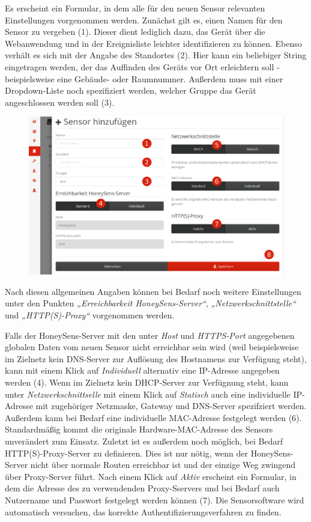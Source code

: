 \documentclass[12pt]{article}
\begin{document}
Es erscheint ein Formular, in dem alle für den neuen Sensor relevanten Einstellungen vorgenommen werden. Zunächst gilt es, einen Namen für den Sensor zu vergeben (1). Dieser dient lediglich dazu, das Gerät über die Webanwendung und in der Ereignisliste leichter identifizieren zu können. Ebenso verhält es sich mit der Angabe des Standortes (2). Hier kann ein beliebiger String eingetragen werden, der das Auffinden des Geräts vor Ort erleichtern soll - beispielsweise eine Gebäude- oder Raumnummer. Außerdem muss mit einer Dropdown-Liste noch spezifiziert werden, welcher Gruppe das Gerät angeschlossen werden soll (3).

\begin{figure}[h]
				\centering
				\includegraphics[width=\textwidth]{./graphics/howto-sensor-add-2.png}
				\label{fig:howto-sensor-add-2}
\end{figure}

Nach diesen allgemeinen Angaben können bei Bedarf noch weitere Einstellungen unter den Punkten \textit{„Erreichbarkeit HoneySens-Server“}, \textit{„Netzwerkschnittstelle“} und \textit{„HTTP(S)-Proxy“} vorgenommen werden. 

Falls der HoneySens-Server mit den unter \textit{Host} und \textit{HTTPS-Port} angegebenen globalen Daten vom neuen Sensor nicht erreichbar sein wird (weil beispielsweise im Zielnetz kein DNS-Server zur Auflösung des Hostnamens zur Verfügung steht), kann mit einem Klick auf \textit{Individuell} alternativ eine IP-Adresse angegeben werden (4). Wenn im Zielnetz kein DHCP-Server zur Verfügnung steht, kann unter \textit{Netzwerkschnittselle} mit einem Klick auf \textit{Statisch} auch eine individuelle IP-Adresse mit zugehöriger Netzmaske, Gateway und DNS-Server spezifziert werden. Außerdem kann bei Bedarf eine individuelle MAC-Adresse festgelegt werden (6). Standardmäßig kommt die originale Hardware-MAC-Adresse des Sensors unverändert zum Einsatz. Zuletzt ist es außerdem noch möglich, bei Bedarf HTTP(S)-Proxy-Server zu definieren. Dies ist nur nötig, wenn der HoneySens-Server nicht über normale Routen erreichbar ist und der einzige Weg zwingend über Proxy-Server führt. Nach einem Klick auf \textit{Aktiv} erscheint ein Formular, in dem die Adresse des zu verwendenden Proxy-Sservers und bei Bedarf auch Nutzername und Passwort festgelegt werden können (7). Die Sensorsoftware wird automatisch versuchen, das korrekte Authentifizierungsverfahren zu finden.
\end{document}
